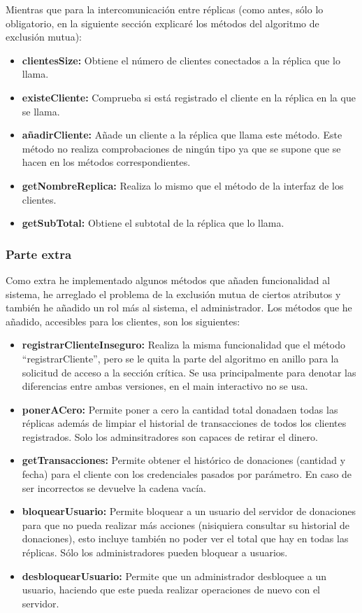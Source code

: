 \documentclass{article}
\begin{document}
Mientras que para la intercomunicación entre réplicas (como antes, sólo lo obligatorio, en la siguiente sección explicaré los métodos del algoritmo de exclusión mutua):

\begin{itemize}
    \item \textbf{clientesSize: }Obtiene el número de clientes conectados a la réplica que lo llama.
    \item \textbf{existeCliente: }Comprueba si está registrado el cliente en la réplica en la que se llama.
    \item \textbf{añadirCliente: }Añade un cliente a la réplica que llama este método. Este método no realiza comprobaciones de ningún tipo ya que se supone que se hacen en los métodos correspondientes.
    \item \textbf{getNombreReplica: }Realiza lo mismo que el método de la interfaz de los clientes.
    \item \textbf{getSubTotal: }Obtiene el subtotal de la réplica que lo llama.
\end{itemize}

\subsubsection{Parte extra}
Como extra he implementado algunos métodos que añaden funcionalidad al sistema, he arreglado el problema de la exclusión mutua de ciertos atributos y también he añadido un rol más al sistema, el administrador. Los métodos que he añadido, accesibles para los clientes, son los siguientes:


\begin{itemize}
    \item \textbf{registrarClienteInseguro: }Realiza la misma funcionalidad que el método ``registrarCliente'', pero se le quita la parte del algoritmo en anillo para la solicitud de acceso a la sección crítica. Se usa principalmente para denotar las diferencias entre ambas versiones, en el main interactivo no se usa.
    \item \textbf{ponerACero: }Permite poner a cero la cantidad total donadaen todas las réplicas además de limpiar el historial de transacciones de todos los clientes registrados. Solo los adminsitradores son capaces de retirar el dinero.
    \item \textbf{getTransacciones: }Permite obtener el histórico de donaciones (cantidad y fecha) para el cliente con los credenciales pasados por parámetro. En caso de ser incorrectos se devuelve la cadena vacía.
    \item \textbf{bloquearUsuario: }Permite bloquear a un usuario del servidor de donaciones para que no pueda realizar más acciones (nisiquiera consultar su historial de donaciones), esto incluye también no poder ver el total que hay en todas las réplicas. Sólo los administradores pueden bloquear a usuarios.
    \item \textbf{desbloquearUsuario: }Permite que un administrador desbloquee a un usuario, haciendo que este pueda realizar operaciones de nuevo con el servidor.
\end{itemize}
\end{document}
